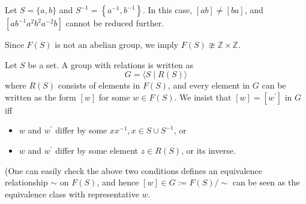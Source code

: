 \begin{example} Let \(S = \{ a,b\}\) and \({S}^{-1} = \left\{  {{a}^{-1},{b}^{-1}}\right\}\). In this case, \(\left\lbrack  {ab}\right\rbrack   \neq  \left\lbrack  {ba}\right\rbrack\), and \(\left\lbrack  {a{b}^{-1}{a}^{2}{b}^{2}{a}^{-2}b}\right\rbrack\) cannot be reduced further.

Since \(F(S)\) is not an abelian group, we imply \(F\left( S\right) \ncong \mathbb{Z} \times  \mathbb{Z}\).
\end{example}


\begin{definition}  Let \(S\) be a set. A group with relations is written as
\[
G = \langle S \mid  R\left( S\right) \rangle
\]
where \(R\left( S\right)\) consists of elements in \(F\left( S\right)\), and every element in \(G\) can be written as the form \(\left\lbrack  w\right\rbrack\) for some  \(w  \in  F\left( S\right)\). We insist that \(\left\lbrack  w\right\rbrack   = \left\lbrack  {w}^{\prime }\right\rbrack\) in \(G\) iff 
\begin{itemize}
\item \(w\) and \({w}^{\prime }\) differ by some \(x{x}^{-1},x \in  S \cup  {S}^{-1}\), or
\item \(w\) and \({w}^{\prime }\) differ by some element \(z \in  R\left( S\right)\), or its inverse.
\end{itemize}
(One can easily check the above two conditions defines an equivalence relationship $\sim$ on $F(S)$, and hence $[w] \in G := F(S)/ \sim$ can be seen as the equivalence class with representative $w$. 
\end{definition}

